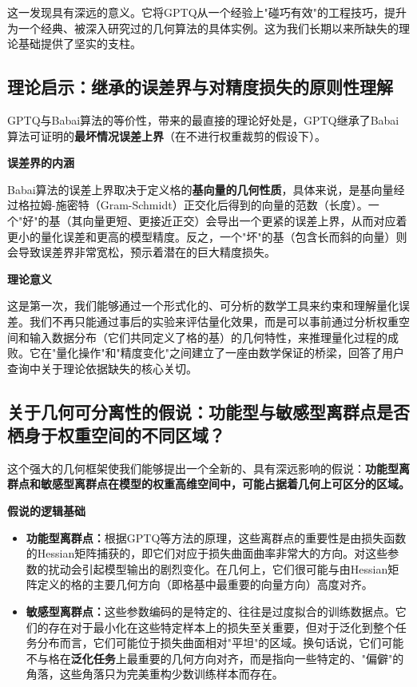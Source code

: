 \documentclass[letterpaper,twocolumn,10pt]{article}
\begin{document}
这一发现具有深远的意义。它将GPTQ从一个经验上"碰巧有效"的工程技巧，提升为一个经典、被深入研究过的几何算法的具体实例。这为我们长期以来所缺失的理论基础提供了坚实的支柱。

\subsection{理论启示：继承的误差界与对精度损失的原则性理解}

GPTQ与Babai算法的等价性，带来的最直接的理论好处是，GPTQ继承了Babai算法可证明的\textbf{最坏情况误差上界}（在不进行权重裁剪的假设下）。

\textbf{误差界的内涵}

Babai算法的误差上界取决于定义格的\textbf{基向量的几何性质}，具体来说，是基向量经过格拉姆-施密特（Gram-Schmidt）正交化后得到的向量的范数（长度）。一个"好"的基（其向量更短、更接近正交）会导出一个更紧的误差上界，从而对应着更小的量化误差和更高的模型精度。反之，一个"坏"的基（包含长而斜的向量）则会导致误差界非常宽松，预示着潜在的巨大精度损失。

\textbf{理论意义}

这是第一次，我们能够通过一个形式化的、可分析的数学工具来约束和理解量化误差。我们不再只能通过事后的实验来评估量化效果，而是可以事前通过分析权重空间和输入数据分布（它们共同定义了格的基）的几何特性，来推理量化过程的成败。它在"量化操作"和"精度变化"之间建立了一座由数学保证的桥梁，回答了用户查询中关于理论依据缺失的核心关切。

\subsection{关于几何可分离性的假说：功能型与敏感型离群点是否栖身于权重空间的不同区域？}

这个强大的几何框架使我们能够提出一个全新的、具有深远影响的假说：\textbf{功能型离群点和敏感型离群点在模型的权重高维空间中，可能占据着几何上可区分的区域。}

\textbf{假说的逻辑基础}

\begin{itemize}
\item \textbf{功能型离群点：}根据GPTQ等方法的原理，这些离群点的重要性是由损失函数的Hessian矩阵捕获的，即它们对应于损失曲面曲率非常大的方向。对这些参数的扰动会引起模型输出的剧烈变化。在几何上，它们很可能与由Hessian矩阵定义的格的主要几何方向（即格基中最重要的向量方向）高度对齐。
\item \textbf{敏感型离群点：}这些参数编码的是特定的、往往是过度拟合的训练数据点。它们的存在对于最小化在这些特定样本上的损失至关重要，但对于泛化到整个任务分布而言，它们可能位于损失曲面相对"平坦"的区域。换句话说，它们可能不与格在\textbf{泛化任务}上最重要的几何方向对齐，而是指向一些特定的、"偏僻"的角落，这些角落只为完美重构少数训练样本而存在。
\end{itemize}
\end{document}
